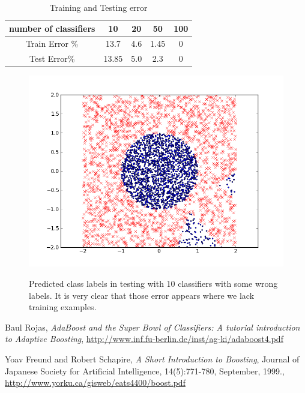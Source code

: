 \documentclass[]{article}  %
\begin{document}
\begin{table}[htdp]
\caption{Training and Testing error }
\begin{center}
\begin{tabular}{c|c|c|c|c}

number of classifiers & 10 & 20 & 50 & 100\\
\hline
Train Error \% & 13.7 & 4.6 & 1.45 & 0\\
Test Error\% & 13.85 & 5.0 & 2.3 & 0
\end{tabular}
\end{center}
\label{default}
\end{table}%

\begin{figure}[h]
\begin{center}
\includegraphics[scale=.6]{10c.png}\label{fig:axis}
\end{center}
\caption{Predicted class labels in testing with 10 classifiers with some wrong labels. It is very clear that those error appears where we lack training examples. }
\end{figure}%

\begin{thebibliography}{9}

 Baul Rojas, \emph{AdaBoost and the Super Bowl of Classifiers: A tutorial introduction to Adaptive Boosting}, \url{http://www.inf.fu-berlin.de/inst/ag-ki/adaboost4.pdf}

 Yoav Freund and Robert Schapire, \emph{A Short Introduction to Boosting}, Journal of Japanese Society for Artificial Intelligence, 14(5):771-780, September, 1999., \url{http://www.yorku.ca/gisweb/eats4400/boost.pdf}


\end{thebibliography}
\end{document}
